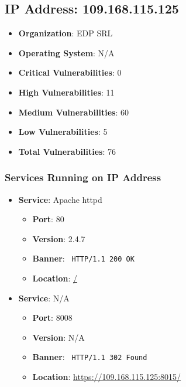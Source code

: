 \documentclass{article}
\begin{document}
\clearpage



\subsection*{IP Address: 109.168.115.125}

\begin{itemize}
    \item \textbf{Organization}: EDP SRL
    \item \textbf{Operating System}:  N/A 
    \item \textbf{Critical Vulnerabilities}: 0
    \item \textbf{High Vulnerabilities}: 11
    \item \textbf{Medium Vulnerabilities}: 60
    \item \textbf{Low Vulnerabilities}: 5
    \item \textbf{Total Vulnerabilities}: 76
\end{itemize}

\subsubsection*{Services Running on IP Address}

\begin{itemize}
    
        \item \textbf{Service}: Apache httpd
        \begin{itemize}
            \item \textbf{Port}: 80
            \item \textbf{Version}:  2.4.7 
            \item \textbf{Banner}: \texttt{
                HTTP/1.1 200 OK
            }
            \item \textbf{Location}: \href{ / }{ / }
        \end{itemize}
    
        \item \textbf{Service}: N/A
        \begin{itemize}
            \item \textbf{Port}: 8008
            \item \textbf{Version}:  N/A 
            \item \textbf{Banner}: \texttt{
                HTTP/1.1 302 Found
            }
            \item \textbf{Location}: \href{ https://109.168.115.125:8015/ }{ https://109.168.115.125:8015/ }
        \end{itemize}
    
\end{itemize}
\end{document}
